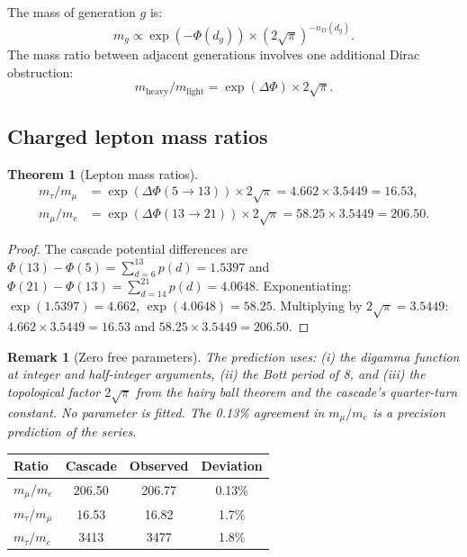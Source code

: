 \documentclass[12pt,a4paper]{article}
\newtheorem{theorem}{Theorem}[section]
\newtheorem*{remark}{Remark}
\begin{document}
The mass of generation $g$ is:
\[
m_g \propto \exp(-\Phi(d_g)) \times (2\sqrt{\pi})^{-n_D(d_g)}.
\]
The mass ratio between adjacent generations involves one additional Dirac obstruction:
\[
m_{\text{heavy}}/m_{\text{light}} = \exp(\Delta\Phi) \times 2\sqrt{\pi}.
\]

\subsection{Charged lepton mass ratios}

\begin{theorem}[Lepton mass ratios]
\begin{align*}
m_\tau/m_\mu &= \exp(\Delta\Phi(5 \to 13)) \times 2\sqrt{\pi} = 4.662 \times 3.5449 = 16.53, \\
m_\mu/m_e &= \exp(\Delta\Phi(13 \to 21)) \times 2\sqrt{\pi} = 58.25 \times 3.5449 = 206.50.
\end{align*}
\end{theorem}

\begin{proof}
The cascade potential differences are $\Phi(13) - \Phi(5) = \sum_{d=6}^{13} p(d) = 1.5397$ and $\Phi(21) - \Phi(13) = \sum_{d=14}^{21} p(d) = 4.0648$. Exponentiating: $\exp(1.5397) = 4.662$, $\exp(4.0648) = 58.25$. Multiplying by $2\sqrt{\pi} = 3.5449$: $4.662 \times 3.5449 = 16.53$ and $58.25 \times 3.5449 = 206.50$.
\end{proof}

\begin{remark}[Zero free parameters]
The prediction uses: (i) the digamma function at integer and half-integer arguments, (ii) the Bott period of 8, and (iii) the topological factor $2\sqrt{\pi}$ from the hairy ball theorem and the cascade's quarter-turn constant. No parameter is fitted. The 0.13\% agreement in $m_\mu/m_e$ is a precision prediction of the series.
\end{remark}

\begin{center}
\begin{tabular}{lccc}
\hline
Ratio & Cascade & Observed & Deviation \\
\hline
$m_\mu/m_e$ & 206.50 & 206.77 & 0.13\% \\
$m_\tau/m_\mu$ & 16.53 & 16.82 & 1.7\% \\
$m_\tau/m_e$ & 3413 & 3477 & 1.8\% \\
\hline
\end{tabular}
\end{center}
\end{document}
